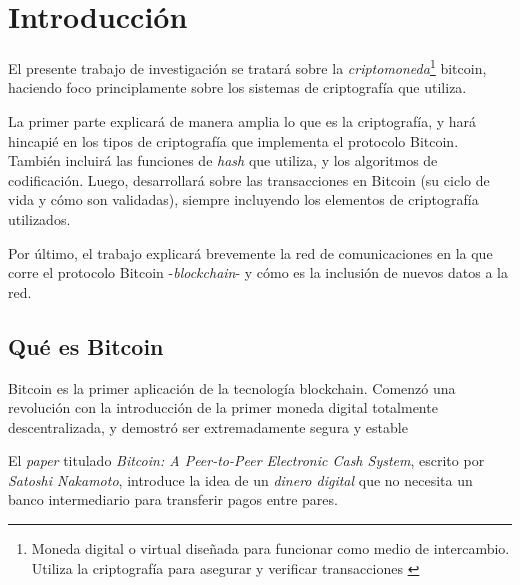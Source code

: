 







\clearpage
\tableofcontents
\clearpage 

\lstset{style=bashstyle}

\section{Introducción}

El presente trabajo de investigación se tratará sobre la \emph{criptomoneda}\footnote{Moneda digital o virtual diseñada para funcionar como medio de intercambio. Utiliza la criptografía para asegurar y verificar transacciones \autocite{CointelegraphBitcoin}} bitcoin, haciendo foco principlamente sobre los sistemas de criptografía que utiliza. 

La primer parte explicará de manera amplia lo que es la criptografía, y hará hincapié en los tipos de criptografía que implementa el protocolo Bitcoin. También incluirá las funciones de \emph{hash} que utiliza, y los algoritmos de codificación. Luego, desarrollará sobre las transacciones en Bitcoin (su ciclo de vida y cómo son validadas), siempre incluyendo los elementos de criptografía utilizados.

Por último, el trabajo explicará brevemente la red de comunicaciones en la que corre el protocolo Bitcoin -\emph{blockchain}- y cómo es la inclusión de nuevos datos a la red.

\subsection{Qué es Bitcoin}

Bitcoin es la primer aplicación de la tecnología blockchain. Comenzó una revolución con la introducción de la primer moneda digital totalmente descentralizada, y demostró ser extremadamente segura y estable \autocite{MasteringBlockchainBitcoin}

El \emph{paper} titulado \emph{Bitcoin: A Peer-to-Peer Electronic Cash System}, escrito por \emph{Satoshi Nakamoto}, introduce la idea de un \emph{dinero digital} que no necesita un banco intermediario para transferir pagos entre pares.

